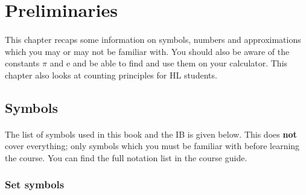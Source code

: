 \documentclass[12pt, a4paper, titlepage, twoside]{article}
\newcommand*{\e}{\textrm{e}}
\begin{document}
	\newpage
	
\section{Preliminaries}	

	\paragraph{}
	This chapter recaps some information on symbols, numbers and approximations which you may or may not be familiar with.
	You should also be aware of the constants $\pi$ and $\e$ and be able to find and use them on your calculator. This chapter
	also looks at counting principles for HL students.
	
	\subsection{Symbols}
	
	\paragraph{}
	The list of symbols used in this book and the IB is given below. This does \textbf{not} cover everything; only symbols
	which you must be familiar with before learning the course. You can find the full notation list in the course guide.
	
	{\centering \subsubsection*{Set symbols}}
	
\end{document}
